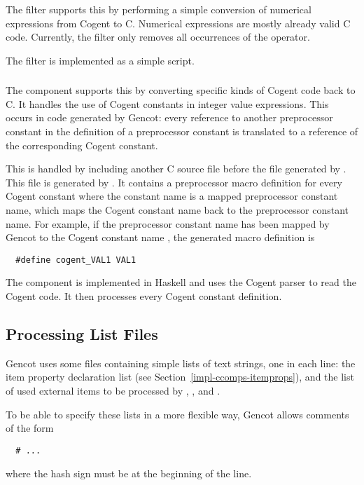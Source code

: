 The filter  supports this by performing a simple conversion of numerical expressions from Cogent
to C. Numerical expressions are mostly already valid C code. Currently, the filter only removes all occurrences
of the  operator.

The filter is implemented as a simple  script.

\subsubsection{}

The  component supports this by converting specific kinds of Cogent code back to C. It handles 
the use of Cogent constants in integer value expressions. This occurs in code generated by Gencot: every reference 
to another preprocessor constant in the definition of a preprocessor constant is translated to a reference of the 
corresponding Cogent constant.

This is handled by including another C source file before the file generated by . This
file is generated by . It contains a preprocessor macro definition for every Cogent constant
where the constant name is a mapped preprocessor constant name, which maps the Cogent constant name back to 
the preprocessor constant name. For example, if the preprocessor constant name  has been mapped by
Gencot to the Cogent constant name , the generated macro definition is
\begin{verbatim}
  #define cogent_VAL1 VAL1
\end{verbatim}

The component  is implemented in Haskell and uses the Cogent parser to read the Cogent code.
It then processes every Cogent constant definition.

\subsection{Processing List Files}
\label{impl-ocomps-prclist}

Gencot uses some files containing simple lists of text strings, one in each line: the item property declaration list (see 
Section~\ref{impl-ccomps-itemprops}), and the list of used external items to be processed by , 
, and .

To be able to specify these lists in a more flexible way, Gencot allows comments of the form
\begin{verbatim}
  # ...
\end{verbatim}
where the hash sign must be at the beginning of the line.

